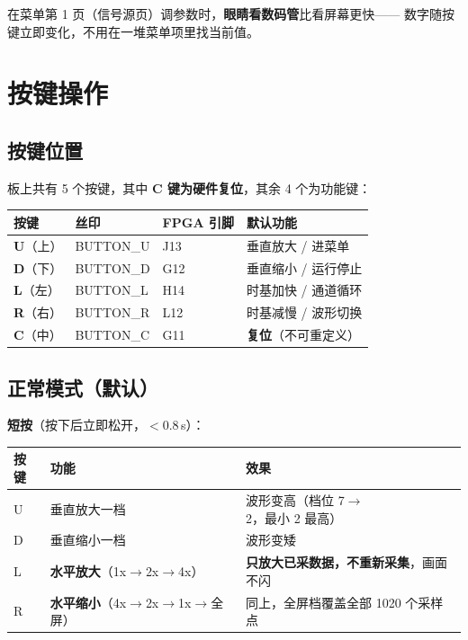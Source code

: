 \documentclass[UTF8,a4paper,11pt]{ctexart}
\begin{document}
\begin{tipbox}
在菜单第 1 页（信号源页）调参数时，\textbf{眼睛看数码管}比看屏幕更快——
数字随按键立即变化，不用在一堆菜单项里找当前值。
\end{tipbox}

\section{按键操作}
\label{sec:key}

\subsection{按键位置}

板上共有 5 个按键，其中 \textbf{C 键为硬件复位}，其余 4 个为功能键：

\begin{center}
\small
\begin{tabular}{llll}
\toprule
按键 & 丝印 & FPGA 引脚 & 默认功能\\
\midrule
\textbf{U}（上） & BUTTON\_U & J13 & 垂直放大 / 进菜单\\
\textbf{D}（下） & BUTTON\_D & G12 & 垂直缩小 / 运行停止\\
\textbf{L}（左） & BUTTON\_L & H14 & 时基加快 / 通道循环\\
\textbf{R}（右） & BUTTON\_R & L12 & 时基减慢 / 波形切换\\
\textbf{C}（中） & BUTTON\_C & G11 & \textbf{复位}（不可重定义）\\
\bottomrule
\end{tabular}
\end{center}

\subsection{正常模式（默认）}

\textbf{短按}（按下后立即松开，$<0.8$\,s）：

\begin{center}
\small
\begin{tabular}{lll}
\toprule
按键 & 功能 & 效果\\
\midrule
U & 垂直放大一档 & 波形变高（档位 7$\rightarrow$2，最小 2 最高）\\
D & 垂直缩小一档 & 波形变矮\\
L & \textbf{水平放大}（1x$\rightarrow$2x$\rightarrow$4x） & \textbf{只放大已采数据，不重新采集}，画面不闪\\
R & \textbf{水平缩小}（4x$\rightarrow$2x$\rightarrow$1x$\rightarrow$全屏） & 同上，全屏档覆盖全部 1020 个采样点\\
\bottomrule
\end{tabular}
\end{center}
\end{document}
